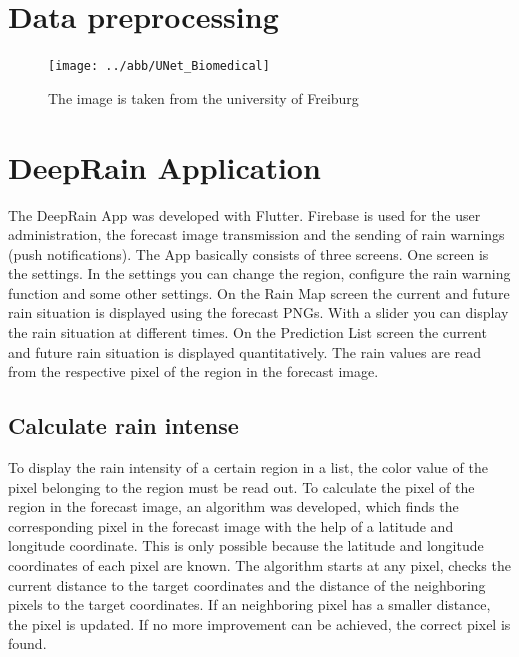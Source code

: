\documentclass[oneside]{htwg-report}
\begin{document}
\section*{Data preprocessing}

\begin{figure}[ht]
\centering
\texttt{[image: ../abb/UNet\_Biomedical]}
\caption{The image is taken from the university of Freiburg~\cite{ronneberger2015u}}
\end{figure}

\begin{sloppypar}
\noindent
\end{sloppypar}

\section*{DeepRain Application}
    \begin{sloppypar}
        The DeepRain App was developed with Flutter. 
        Firebase is used for the user administration, the forecast image transmission and the sending of rain warnings (push notifications). 
        The App basically consists of three screens. One screen is the settings. 
        In the settings you can change the region, configure the rain warning function and some other settings.
        On the Rain Map screen the current and future rain situation is displayed using the forecast PNGs. With a slider you can display the rain situation at different times.
        On the Prediction List screen the current and future rain situation is displayed quantitatively. The rain values are read from the respective pixel of the region in the forecast image.   
    \end{sloppypar}
\subsection*{Calculate rain intense}
    \begin{sloppypar}
        To display the rain intensity of a certain region in a list, the color value of the pixel belonging to the region must be read out. 
        To calculate the pixel of the region in the forecast image, an algorithm was developed, which finds the corresponding pixel in the forecast image with the help of a latitude and longitude coordinate. 
        This is only possible because the latitude and longitude coordinates of each pixel are known. 
        The algorithm starts at any pixel, checks the current distance to the target coordinates and the distance of the neighboring pixels to the target coordinates. 
        If an neighboring pixel has a smaller distance, the pixel is updated. If no more improvement can be achieved, the correct pixel is found. 
    \end{sloppypar}
\end{document}
